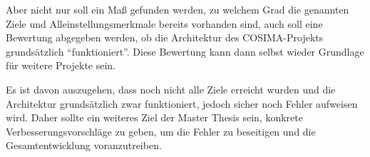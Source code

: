   
  Aber nicht nur soll ein Maß gefunden werden, zu welchem Grad die genannten Ziele und Alleinstellungsmerkmale bereits vorhanden sind, auch soll eine Bewertung abgegeben werden, ob die Architektur des COSIMA-Projekts grundsätzlich "`funktioniert"'. Diese Bewertung kann dann selbst wieder Grundlage für weitere Projekte sein.
  
  Es ist davon auszugehen, dass noch nicht alle Ziele erreicht wurden und die Architektur grundsätzlich zwar funktioniert, jedoch sicher noch Fehler aufweisen wird. Daher sollte ein weiteres Ziel der Master Thesis sein, konkrete Verbesserungsvorschläge zu geben, um die Fehler zu beseitigen und die Gesamtentwicklung voranzutreiben.
  

